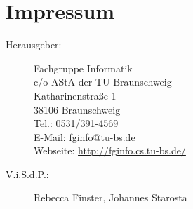 \section{Impressum}
\label{impressum}
\begin{description}
\item[Herausgeber:]
	Fachgruppe Informatik\\
	c/o AStA der TU Braunschweig\\
	Katharinenstraße 1\\
	38106 Braunschweig\\
	Tel.: 0531/391-4569\\
	E-Mail: \url{fginfo@tu-bs.de}\\
	Webseite: \url{http://fginfo.cs.tu-bs.de/}
\item[V.i.S.d.P.:]  %
  Rebecca Finster, Johannes Starosta
\end{description}

